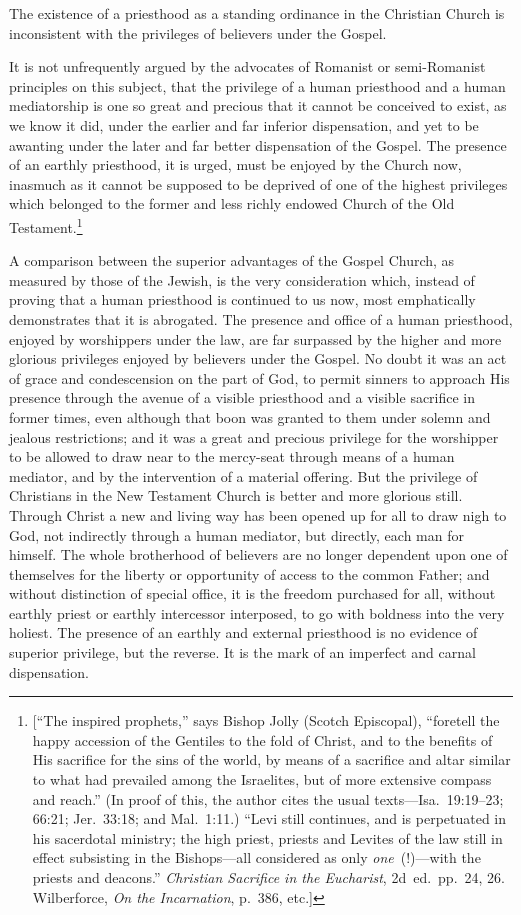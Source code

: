 \documentclass[
  english,
]{book}
\begin{document}
The existence of a priesthood as a standing ordinance in the Christian Church is inconsistent with the privileges of believers under the Gospel.

It is not unfrequently argued by the advocates of Romanist or semi-Romanist principles on this subject, that the privilege of a human priesthood and a human mediatorship is one so great and precious that it cannot be conceived to exist, as we know it did, under the earlier and far inferior dispensation, and yet to be awanting under the later and far better dispensation of the Gospel. The presence of an earthly priesthood, it is urged, must be enjoyed by the Church now, inasmuch as it cannot be supposed to be deprived of one of the highest privileges which belonged to the former and less richly endowed Church of the Old Testament.\footnote{{[}``The inspired prophets,'' says Bishop Jolly (Scotch Episcopal), ``foretell the happy accession of the Gentiles to the fold of Christ, and to the benefits of His sacrifice for the sins of the world, by means of a sacrifice and altar similar to what had prevailed among the Israelites, but of more extensive compass and reach.'' (In proof of this, the author cites the usual texts---Isa.~19:19--23; 66:21; Jer.~33:18; and Mal.~1:11.) ``Levi still continues, and is perpetuated in his sacerdotal ministry; the high priest, priests and Levites of the law still in effect subsisting in the Bishops---all considered as only \emph{one}~(!)---with the priests and deacons.'' \emph{Christian Sacrifice in the Eucharist}, 2d~ed.~pp.~24, 26. Wilberforce, \emph{On the Incarnation}, p.~386, etc.{]}}

A comparison between the superior advantages of the Gospel Church, as measured by those of the Jewish, is the very consideration which, instead of proving that a human priesthood is continued to us now, most emphatically demonstrates that it is abrogated. The presence and office of a human priesthood, enjoyed by worshippers under the law, are far surpassed by the higher and more glorious privileges enjoyed by believers under the Gospel. No doubt it was an act of grace and condescension on the part of God, to permit sinners to approach His presence through the avenue of a visible priesthood and a visible sacrifice in former times, even although that boon was granted to them under solemn and jealous restrictions; and it was a great and precious privilege for the worshipper to be allowed to draw near to the mercy-seat through means of a human mediator, and by the intervention of a material offering. But the privilege of Christians in the New Testament Church is better and more glorious still. Through Christ a new and living way has been opened up for all to draw nigh to God, not indirectly through a human mediator, but directly, each man for himself. The whole brotherhood of believers are no longer dependent upon one of themselves for the liberty or opportunity of access to the common Father; and without distinction of special office, it is the freedom purchased for all, without earthly priest or earthly intercessor interposed, to go with boldness into the very holiest. The presence of an earthly and external priesthood is no evidence of superior privilege, but the reverse. It is the mark of an imperfect and carnal dispensation.
\end{document}
